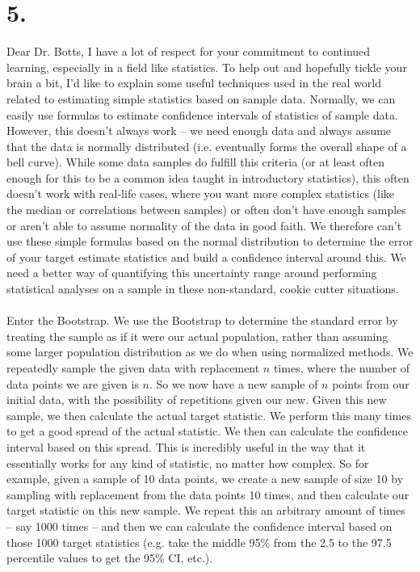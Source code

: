 \documentclass{article}
\begin{document}
{\Large 

\section*{5.}

Dear Dr. Botts, I have a lot of respect for your commitment to continued learning, especially in a field like statistics. To help out and hopefully tickle your brain a bit, I'd like to explain some useful techniques used in the real world related to estimating simple statistics based on sample data. Normally, we can easily use formulas to estimate confidence intervals of statistics of sample data. However, this doesn't always work -- we need enough data and always assume that the data is normally distributed (i.e. eventually forms the overall shape of a bell curve). While some data samples do fulfill this criteria (or at least often enough for this to be a common idea taught in introductory statistics), this often doesn't work with real-life cases, where you want more complex statistics (like the median or correlations between samples) or often don't have enough samples or aren't able to assume normality of the data in good faith. We therefore can't use these simple formulas based on the normal distribution to determine the error of your target estimate statistics and build a confidence interval around this. We need a better way of quantifying this uncertainty range around performing statistical analyses on a sample in these non-standard, cookie cutter situations. \\ \\
Enter the Bootstrap. We use the Bootstrap to determine the standard error by treating the sample as if it were our actual population, rather than assuming some larger population distribution as we do when using normalized methods. We repeatedly sample the given data with replacement \(n\) times, where the number of data points we are given is \(n\). So we now have a new sample of \(n\) points from our initial data, with the possibility of repetitions given our new. Given this new sample, we then calculate the actual target statistic. We perform this many times to get a good spread of the actual statistic. We then can calculate the confidence interval based on this spread. This is incredibly useful in the way that it essentially works for any kind of statistic, no matter how complex. So for example, given a sample of 10 data points, we create a new sample of size 10 by sampling with replacement from the data points 10 times, and then calculate our target statistic on this new sample. We repeat this an arbitrary amount of times -- say 1000 times -- and then we can calculate the confidence interval based on those 1000 target statistics (e.g. take the middle 95\% from the 2.5 to the 97.5 percentile values to get the 95\% CI, etc.). \\ \\
}
\end{document}
